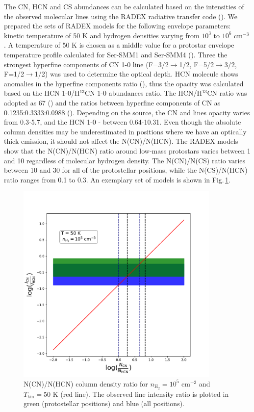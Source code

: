 \documentclass[a4paper]{article}
\begin{document}
\indent \indent The CN, HCN and CS abundances can be calculated based on the intensities of the observed molecular lines using the RADEX radiative transfer code (\cite{tak2007}). We prepared the sets of RADEX models for the following envelope parameters: kinetic temperature of 50 K and hydrogen densities varying from $10^3$ to $10^6$ cm$^{-3}$. A temperature of 50 K is chosen as a middle value for a protostar envelope temperature profile calculated for Ser-SMM1 and Ser-SMM4 (\cite{kristensen2010}). Three the strongest hyperfine components of CN 1-0 line (F=3/2$\rightarrow$1/2, F=5/2$\rightarrow$3/2, F=1/2$\rightarrow$1/2) was used to determine the optical depth. HCN molecule shows anomalies in the hyperfine components ratio (\cite{loughnane2012}), thus the opacity was calculated based on the HCN 1-0/H$^{13}$CN 1-0 abundances ratio. The HCN/H$^{13}$CN ratio was adopted as 67 (\cite{yan2019}) and the ratios between hyperfine components of CN as 0.1235:0.3333:0.0988 (\cite{skatrud1983}). Depending on the source, the CN and lines opacity varies from 0.3-5.7, and the HCN 1-0 - between 0.64-10.31. Even though the absolute column densities may be underestimated in positions where we have an optically thick emission, it should not affect the N(CN)/N(HCN). The RADEX models show that the N(CN)/N(HCN) ratio around low-mass protostars varies between 1 and 10 regardless of molecular hydrogen density. The N(CN)/N(CS) ratio varies between 10 and 30 for all of the protostellar positions, while the N(CS)/N(HCN) ratio ranges from 0.1 to 0.3. An exemplary set of models is shown in Fig.\,\ref{fig3}.

\begin{figure}[!h]
\centering
\includegraphics[height=10cm]{radex.pdf}
\caption{N(CN)/N(HCN) column density ratio for $n_\mathrm{H_2} = 10^5$ cm$^{-3}$ and $T_\mathrm{kin} = 50$ K (red line). The observed line intensity ratio is plotted in green (protostellar positions) and blue (all positions).}\label{fig3}
\end{figure}
\end{document}
